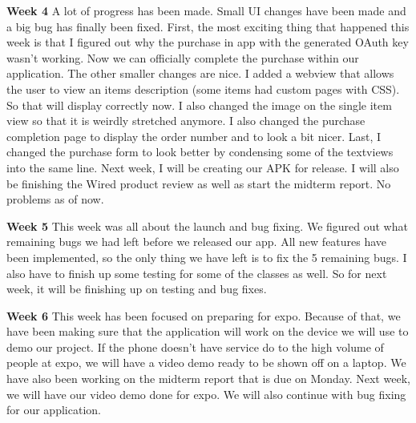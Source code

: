 \documentclass[journal,compsoc, 10pt, draftclsnofoot, onecolumn]{IEEEtran}
\begin{document}
\textbf{Week 4}\newline
A lot of progress has been made. Small UI changes have been made and a big bug has finally been 
fixed. First, the most exciting thing that happened this week is that I figured out why the
purchase in app with the generated OAuth key wasn't working. Now we can officially complete the 
purchase within our application. The other smaller changes are nice. I added a webview that
allows the user to view an items description (some items had custom pages with CSS). So that
will display correctly now. I also changed the image on the single item view so that it is
weirdly stretched anymore. I also changed the purchase completion page to display the order
number and to look a bit nicer. Last, I changed the purchase form to look better by condensing
some of the textviews into the same line. Next week, I will be creating our APK for release. I
will also be finishing the Wired product review as well as start the midterm report. No
problems as of now.\newline

\textbf{Week 5}\newline
This week was all about the launch and bug fixing. We figured out what remaining bugs we had
left before we released our app. All new features have been implemented, so the only thing we
have left is to fix the 5 remaining bugs. I also have to finish up some testing for some of the 
classes as well. So for next week, it will be finishing up on testing and bug fixes.\newline

\textbf{Week 6}\newline
This week has been focused on preparing for expo. Because of that, we have been making sure
that the application will work on the device we will use to demo our project. If the phone
doesn't have service do to the high volume of people at expo, we will have a video demo ready
to be shown off on a laptop. We have also been working on the midterm report that is due on
Monday. Next week, we will have our video demo done for expo. We will also continue with bug
fixing for our application.\newline
\end{document}
